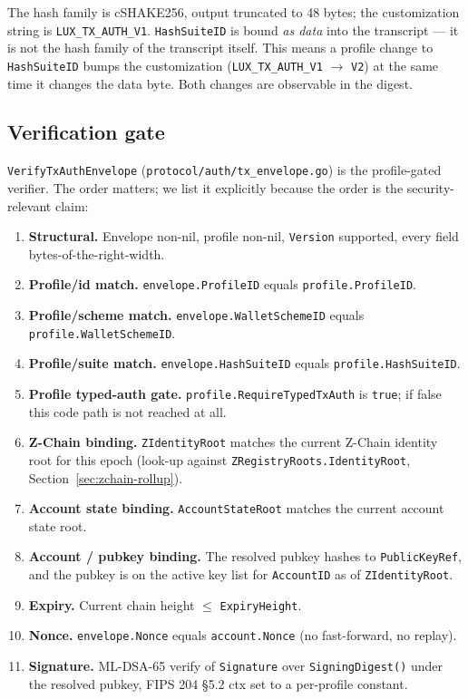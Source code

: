 The hash family is cSHAKE256, output truncated to 48 bytes; the customization
string is \texttt{LUX\_TX\_AUTH\_V1}. \texttt{HashSuiteID} is bound \emph{as
data} into the transcript --- it is not the hash family of the transcript
itself. This means a profile change to \texttt{HashSuiteID} bumps the
customization (\texttt{LUX\_TX\_AUTH\_V1} $\to$ \texttt{V2}) at the same time
it changes the data byte. Both changes are observable in the digest.

\subsection{Verification gate}

\texttt{VerifyTxAuthEnvelope} (\texttt{protocol/auth/tx\_envelope.go}) is the
profile-gated verifier. The order matters; we list it explicitly because
the order is the security-relevant claim:

\begin{enumerate}[leftmargin=2em,nosep]
  \item \textbf{Structural.} Envelope non-nil, profile non-nil,
    \texttt{Version} supported, every field bytes-of-the-right-width.
  \item \textbf{Profile/id match.} \texttt{envelope.ProfileID} equals
    \texttt{profile.ProfileID}.
  \item \textbf{Profile/scheme match.} \texttt{envelope.WalletSchemeID}
    equals \texttt{profile.WalletSchemeID}.
  \item \textbf{Profile/suite match.} \texttt{envelope.HashSuiteID} equals
    \texttt{profile.HashSuiteID}.
  \item \textbf{Profile typed-auth gate.}
    \texttt{profile.RequireTypedTxAuth} is \texttt{true}; if false this
    code path is not reached at all.
  \item \textbf{Z-Chain binding.} \texttt{ZIdentityRoot} matches the
    current Z-Chain identity root for this epoch (look-up against
    \texttt{ZRegistryRoots.IdentityRoot}, Section~\ref{sec:zchain-rollup}).
  \item \textbf{Account state binding.} \texttt{AccountStateRoot} matches
    the current account state root.
  \item \textbf{Account / pubkey binding.} The resolved pubkey hashes to
    \texttt{PublicKeyRef}, and the pubkey is on the active key list for
    \texttt{AccountID} as of \texttt{ZIdentityRoot}.
  \item \textbf{Expiry.} Current chain height $\le$ \texttt{ExpiryHeight}.
  \item \textbf{Nonce.} \texttt{envelope.Nonce} equals
    \texttt{account.Nonce} (no fast-forward, no replay).
  \item \textbf{Signature.} ML-DSA-65 verify of \texttt{Signature} over
    \texttt{SigningDigest()} under the resolved pubkey, FIPS 204 §5.2 ctx
    set to a per-profile constant.
\end{enumerate}

